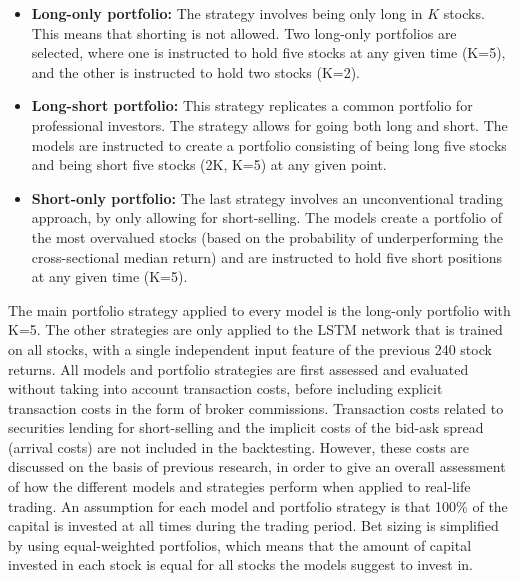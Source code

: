 \indent \newline
\begin{itemize}
\item {\textbf{Long-only portfolio:} The strategy involves being only long in $\textit{K}$ stocks. This means that shorting is not allowed. Two long-only portfolios are selected, where one is instructed to hold five stocks at any given time (K=5), and the other is instructed to hold two stocks (K=2).} 
\item {\textbf{Long-short portfolio:} This strategy replicates a common portfolio for professional investors. The strategy allows for going both long and short. The models are instructed to create a portfolio consisting of being long five stocks and being short five stocks (2K, K=5) at any given point.}
\item {\textbf{Short-only portfolio:} The last strategy involves an unconventional trading approach, by only allowing for short-selling. The models create a portfolio of the most overvalued stocks (based on the probability of underperforming the cross-sectional median return) and are instructed to hold five short positions at any given time (K=5).}
\end{itemize}  

\indent \newline
The main portfolio strategy applied to every model is the long-only portfolio with K=5. The other strategies are only applied to the LSTM network that is trained on all stocks, with a single independent input feature of the previous 240 stock returns. All models and portfolio strategies are first assessed and evaluated without taking into account transaction costs, before including explicit transaction costs in the form of broker commissions. Transaction costs related to securities lending for short-selling and the implicit costs of the bid-ask spread (arrival costs) are not included in the backtesting. However, these costs are discussed on the basis of previous research, in order to give an overall assessment of how the different models and strategies perform when applied to real-life trading. An assumption for each model and portfolio strategy is that 100\% of the capital is invested at all times during the trading period. Bet sizing is simplified by using equal-weighted portfolios, which means that the amount of capital invested in each stock is equal for all stocks the models suggest to invest in. 